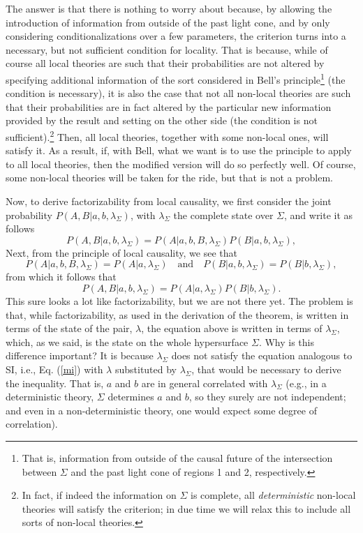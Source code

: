 \documentclass[letterpaper,12pt]{article}
\begin{document}
The answer is that there is nothing to worry about because, by allowing the introduction of information from outside of the past light cone, and by only considering conditionalizations over a few parameters, the criterion turns into a necessary, but not sufficient condition for locality. That is because, while of course all local theories are such that their probabilities are not altered by specifying additional information of the sort considered in Bell's principle\footnote{That is, information from outside of the causal future of the intersection between $\Sigma$ and the past light cone of regions 1 and 2, respectively.} (the condition is necessary), it is also the case that not all non-local theories are such that their probabilities are in fact altered by the particular new information provided by the result and setting on the other side (the condition is not sufficient).\footnote{In fact, if indeed the information on $\Sigma$ is complete, all \emph{deterministic} non-local theories will satisfy the criterion; in due time we will relax this to include all sorts of non-local theories.\label{fn}} Then, all local theories, together with some non-local ones, will satisfy it. As a result, if, with Bell, what we want is to use the principle to apply to all local theories, then the modified version will do so perfectly well. Of course, some non-local theories will be taken for the ride, but that is not a problem.

Now, to derive factorizability from local causality, we first consider the joint probability $P(A,B|a,b,\lambda_\Sigma)$, with $\lambda_\Sigma$ the complete state over $\Sigma$, and write it as follows
\begin{equation}\label{PAB}
P(A,B|a,b,\lambda_\Sigma) = P(A|a,b,B,\lambda_\Sigma) P(B|a,b,\lambda_\Sigma),
\end{equation}
Next, from the principle of local causality, we see that
\begin{equation} 
P(A|a,b,B,\lambda_\Sigma) = P(A|a,\lambda_\Sigma) \quad \mbox{and} \quad P(B|a,b,\lambda_\Sigma) = P(B|b,\lambda_\Sigma) ,
\end{equation} 
from which it follows that 
\begin{equation} 
P(A,B|a,b,\lambda_\Sigma) = P(A|a,\lambda_\Sigma) P(B|b,\lambda_\Sigma).
\end{equation}
This sure looks a lot like factorizability, but we are not there yet. The problem is that, while factorizability, as used in the derivation of the theorem, is written in terms of the state of the pair, $\lambda$, the equation above is written in terms of $\lambda_\Sigma$, which, as we said, is the state on the whole hypersurface $\Sigma$. Why is this difference important? It is because $\lambda_\Sigma$ does not satisfy the equation analogous to SI, i.e., Eq. (\ref{mi}) with $\lambda$ substituted by $\lambda_\Sigma$, that would be necessary to derive the inequality. That is, $a$ and $b$ are in general correlated with $\lambda_\Sigma$ (e.g., in a deterministic theory, $\Sigma$ determines $a$ and $b$, so they surely are not independent; and even in a non-deterministic theory, one would expect some degree of correlation).
\end{document}
